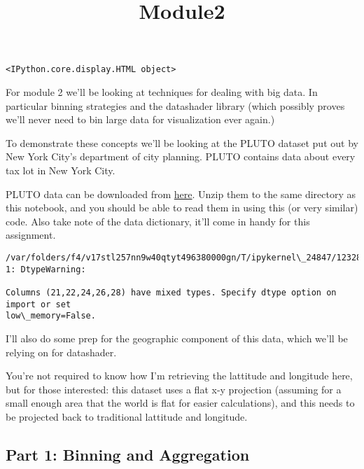 \documentclass[11pt]{article}
\title{Module2}
\begin{document}
    
    \maketitle
    
    

    
    
    
    
    \begin{Verbatim}[commandchars=\\\{\}]
<IPython.core.display.HTML object>
    \end{Verbatim}

    
    For module 2 we'll be looking at techniques for dealing with big data.
In particular binning strategies and the datashader library (which
possibly proves we'll never need to bin large data for visualization
ever again.)

To demonstrate these concepts we'll be looking at the PLUTO dataset put
out by New York City's department of city planning. PLUTO contains data
about every tax lot in New York City.

PLUTO data can be downloaded from
\href{https://www1.nyc.gov/site/planning/data-maps/open-data/dwn-pluto-mappluto.page}{here}.
Unzip them to the same directory as this notebook, and you should be
able to read them in using this (or very similar) code. Also take note
of the data dictionary, it'll come in handy for this assignment.

    \begin{Verbatim}[commandchars=\\\{\}]
/var/folders/f4/v17stl257nn9w40qtyt496380000gn/T/ipykernel\_24847/1232822874.py:1
1: DtypeWarning:

Columns (21,22,24,26,28) have mixed types. Specify dtype option on import or set
low\_memory=False.

    \end{Verbatim}

    I'll also do some prep for the geographic component of this data, which
we'll be relying on for datashader.

You're not required to know how I'm retrieving the lattitude and
longitude here, but for those interested: this dataset uses a flat x-y
projection (assuming for a small enough area that the world is flat for
easier calculations), and this needs to be projected back to traditional
lattitude and longitude.

    \hypertarget{part-1-binning-and-aggregation}{%
\subsection{Part 1: Binning and
Aggregation}\label{part-1-binning-and-aggregation}}
\end{document}
